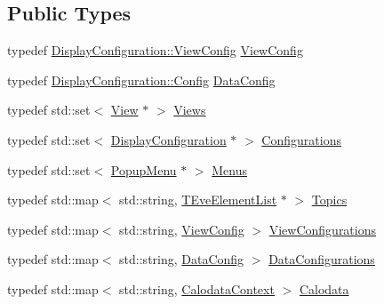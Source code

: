 \subsection*{Public Types}
\begin{DoxyCompactItemize}
\item 
typedef \hyperlink{class_d_d4hep_1_1_display_configuration_1_1_view_config}{DisplayConfiguration::ViewConfig} \hyperlink{class_d_d4hep_1_1_display_a7be76e4de32d9d1084a6ca2f52669f68}{ViewConfig}
\item 
typedef \hyperlink{class_d_d4hep_1_1_display_configuration_1_1_config}{DisplayConfiguration::Config} \hyperlink{class_d_d4hep_1_1_display_a79237f24a5b3ec781faa5f8e20579ae0}{DataConfig}
\item 
typedef std::set$<$ \hyperlink{class_d_d4hep_1_1_view}{View} $\ast$ $>$ \hyperlink{class_d_d4hep_1_1_display_a93fcdf6ec0390291e26d59d0d78cd6e8}{Views}
\item 
typedef std::set$<$ \hyperlink{class_d_d4hep_1_1_display_configuration}{DisplayConfiguration} $\ast$ $>$ \hyperlink{class_d_d4hep_1_1_display_a6e411e86cfcb41b915d77edf154265dd}{Configurations}
\item 
typedef std::set$<$ \hyperlink{class_d_d4hep_1_1_popup_menu}{PopupMenu} $\ast$ $>$ \hyperlink{class_d_d4hep_1_1_display_a4dbc259bd581b56802ef3c29b72909be}{Menus}
\item 
typedef std::map$<$ std::string, \hyperlink{class_t_eve_element_list}{TEveElementList} $\ast$ $>$ \hyperlink{class_d_d4hep_1_1_display_ab7cf442eb2211f57f55b7cd1cf8a61c1}{Topics}
\item 
typedef std::map$<$ std::string, \hyperlink{class_d_d4hep_1_1_display_configuration_1_1_view_config}{ViewConfig} $>$ \hyperlink{class_d_d4hep_1_1_display_a1bb7fbc1eeb22ef2b1cea35c78e9d27a}{ViewConfigurations}
\item 
typedef std::map$<$ std::string, \hyperlink{class_d_d4hep_1_1_display_configuration_1_1_config}{DataConfig} $>$ \hyperlink{class_d_d4hep_1_1_display_a730a4516989abe8b2f788c8f957e0633}{DataConfigurations}
\item 
typedef std::map$<$ std::string, \hyperlink{struct_d_d4hep_1_1_display_1_1_calodata_context}{CalodataContext} $>$ \hyperlink{class_d_d4hep_1_1_display_a692339ace65797a205d2332c4a652598}{Calodata}
\end{DoxyCompactItemize}
